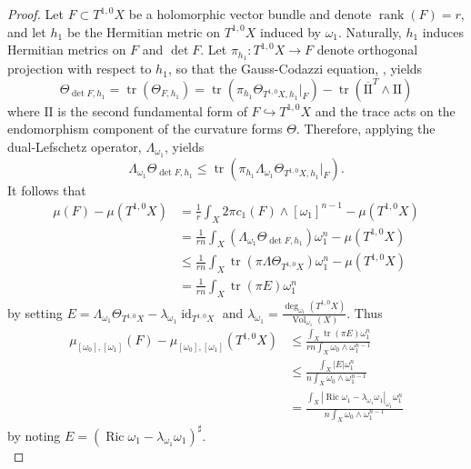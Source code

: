 \documentclass[12pt]{article}
\numberwithin{equation}{section}
\newcommand{\II}{\mathrm{II}}
\DeclareMathOperator{\Ric}{Ric}
\DeclareMathOperator{\tr}{tr}
\DeclareMathOperator{\Vol}{Vol}
\DeclareMathOperator{\id}{id}
\DeclareMathOperator{\rank}{rank}
\newcommand{\oo}[1]{\overline{#1}}
\begin{document}
\begin{proof}
Let $F \subset T^{1,0} X$ be a holomorphic vector bundle and denote $\rank(F) = r$, and let $h_1$ be the Hermitian metric on $T^{1,0} X$ induced by $\omega_1$. Naturally, $h_1$ induces Hermitian metrics on $F$ and $\det F$. Let $\pi_{h_1}: T^{1,0}X \to F$ denote orthogonal projection with respect to $h_1$, so that the Gauss-Codazzi equation, \cite{GH94}, yields
\begin{equation*}
    \Theta_{\det F,h_1} = \tr(\Theta_{F,h_1})= \tr (\pi_{h_1} \Theta_{T^{1,0} X, h_1}|_F) - \tr(\oo{\II}^T \wedge \II)
\end{equation*}
where $\II$ is the second fundamental form of $F \hookrightarrow T^{1,0} X$ and the trace acts on the endomorphism component of the curvature forms $\Theta$. Therefore, applying the dual-Lefschetz operator, $\Lambda_{\omega_1}$, yields
\begin{equation*}
    \Lambda_{\omega_1} \Theta_{\det F, h_1} \leq \tr(\pi_{h_1} \Lambda_{\omega_1}\Theta_{T^{1,0}X, h_1}|_F).
\end{equation*}
It follows that
\begin{align*}
    \mu(F) - \mu(T^{1,0}X) &= \frac{1}{r} \int_X 2 \pi c_1(F) \wedge [\omega_1]^{n-1} - \mu(T^{1,0}X)\\
    &= \frac{1}{rn} \int_X (\Lambda_{\omega_1} \Theta_{\det F, h_1}) \omega_1^n - \mu(T^{1,0}X)\\
    &\leq \frac{1}{rn}\int_X \tr(\pi \Lambda \Theta_{T^{1,0}X}) \omega_1^n - \mu(T^{1,0} X)\\
    &= \frac{1}{rn} \int_X \tr(\pi E) \omega_1^n
\end{align*}
by setting $E = \Lambda_{\omega_1} \Theta_{T^{1,0}X} - \lambda_{\omega_1} \id_{T^{1,0}X}$ and $\lambda_{\omega_1} = \frac{\deg_{\omega_1}(T^{1,0}X)}{\Vol_{\omega_1}(X)}$. Thus
\begin{align*}
    \mu_{[\omega_0], [\omega_1]}(F) - \mu_{[\omega_0],[\omega_1]}(T^{1,0}X) &\leq \frac{ \int_X \tr(\pi E) \omega_1^n}{rn \int_X \omega_0 \wedge \omega_1^{n-1}}\\
    &\leq \frac{ \int_X |E|\omega_1^n}{n \int_X \omega_0 \wedge \omega_1^{n-1}}\\
    &= \frac{\int_X |\Ric \omega_1 - \lambda_{\omega_1} \omega_1|_{\omega_1} \omega_1^n}{n \int_X \omega_0 \wedge \omega_1^{n-1}}
\end{align*}
by noting $E= (\Ric \omega_1 - \lambda_{\omega_1} \omega_1)^{\sharp}$.\\


\end{proof}
\end{document}
